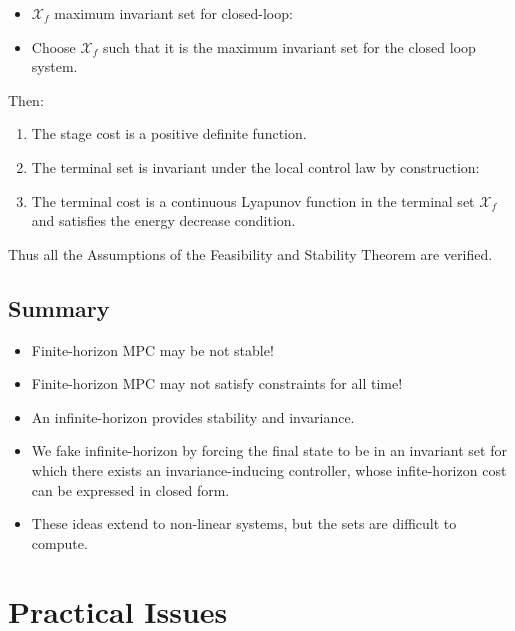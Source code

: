 \documentclass[8pt,a4paper]{scrartcl}
\begin{document}
\begin{multicols*}{3}
\begin{itemize}
\item $\mathcal{X}_f$ \dahe maximum invariant set for closed-loop:


\item Choose $\mathcal{X}_f$ such that it is the maximum invariant set for the closed loop system.


\end{itemize}

Then:

\begin{enumerate}
\ncompaq
\item The stage cost is a positive definite function.
\item The terminal set is invariant under the local control law by construction:

\item The terminal cost is a continuous Lyapunov function in the terminal set $\mathcal{X}_f$ and satisfies the energy decrease condition.
\end{enumerate}

Thus all the Assumptions of the Feasibility and Stability Theorem are verified.

\subsection{Summary}

\begin{itemize}
\ncompaq
\item Finite-horizon MPC may be not stable!
\item Finite-horizon MPC may not satisfy constraints for all time!
\item An infinite-horizon provides stability and invariance.
\item We fake infinite-horizon by forcing the final state to be in an invariant set for which there exists an invariance-inducing controller, whose infite-horizon cost can be expressed in closed form.
\item These ideas extend to non-linear systems, but the sets are difficult to compute.
\end{itemize}

\section{Practical Issues}


\end{multicols*}
\end{document}
